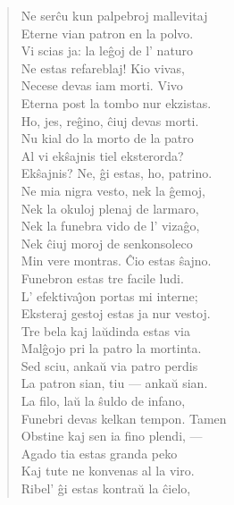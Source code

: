 \begin{verse}
                Ne ser\^cu kun palpebroj mallevitaj\\
                Eterne vian patron en la polvo.\\
                Vi scias ja: la le\^goj de l' naturo\\
                Ne estas refareblaj! Kio vivas,\\
                Necese devas iam morti. Vivo\\
                Eterna post la tombo nur ekzistas.\\
 Ho, jes, reĝino, ĉiuj devas morti.\\
 Nu kial do la morto de la patro\\
                Al vi ek\^sajnis tiel eksterorda?\\
 Ek\^sajnis? Ne, \^gi estas, ho, patrino.\\
                Ne mia nigra vesto, nek la \^gemoj,\\
                Nek la okuloj plenaj de larmaro,\\
                Nek la funebra vido de l' viza\^go,\\
                Nek ĉiuj moroj de senkonsoleco\\
                Min vere montras. \^Cio estas \^sajno.\\
                Funebron estas tre facile ludi.\\
                L' efektiva\^{\j}on portas mi interne;\\
                Eksteraj gestoj estas ja nur vestoj.\\
 Tre bela kaj la\u udinda estas via\\
                Mal\^gojo pri la patro la mortinta.\\
                Sed sciu, anka\u u via patro perdis\\
                La patron sian, tiu --- anka\u u sian.\\
                La filo, la\u u la \^suldo de infano,\\
                Funebri devas kelkan tempon. Tamen\\
                Obstine kaj sen ia fino plendi, ---\\
                Agado tia estas granda peko\\
                Kaj tute ne konvenas al la viro.\\
                Ribel' \^gi estas kontra\u u la \^cielo,\\

\end{verse}
